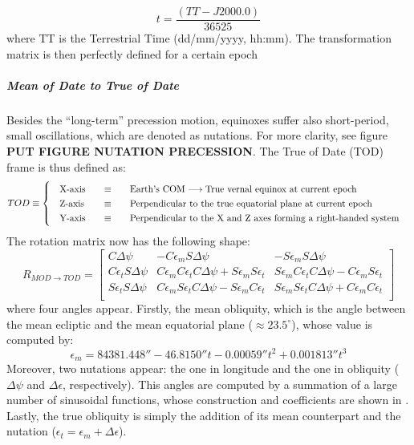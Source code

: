 		\[
		t 	= \dfrac{\left(TT - J2000.0\right)}{36525}		
		\]
		\nonindent where TT is the Terrestrial Time (dd/mm/yyyy, hh:mm). The transformation matrix is then perfectly defined for a certain epoch
		\subparagraph{Mean of Date to True of Date \\}
		\indent Besides the ``long-term'' precession motion, equinoxes suffer also short-period, small oscillations, which are denoted as nutations. For more clarity, see figure \textbf{PUT FIGURE NUTATION PRECESSION}. The True of Date (TOD) frame is thus defined as: \\
		\[
		\arraycolsep=10pt
		\def\arraystretch{1.3}
		TOD\equiv\left\{
		\begin{array}{lll}
		\text{X-axis} 	& \equiv 	& \text{Earth's COM} \longrightarrow \text{True vernal equinox at current epoch} \\
		\text{Z-axis} 	& \equiv 	& \text{Perpendicular to the true equatorial plane at current epoch} \\
		\text{Y-axis} 	& \equiv 	& \text{Perpendicular to the X and Z axes forming a right-handed system} \\
		\end{array}
		\right.
		\]
		\indent The rotation matrix now has the following shape:
		\begin{equation}
		R_{MOD\rightarrow TOD} = 
		\left[ 
		\begin{array}{lll}
		C \Delta \psi 				& - C \epsilon_m S \Delta \psi 	& - S \epsilon_m S \Delta \psi \\
		C \epsilon_t S \Delta \psi 	& C \epsilon_m C \epsilon_t C \Delta \psi + S \epsilon_m S \epsilon_t & S \epsilon_m C \epsilon_t C \Delta \psi - C \epsilon_m S \epsilon_t \\
		S \epsilon_t S \Delta \psi 	& C \epsilon_m S \epsilon_t C \Delta \psi - S \epsilon_m C \epsilon_t & S \epsilon_m S \epsilon_t C \Delta \psi + C \epsilon_m C \epsilon_t \\
		\end{array}
		\right]
		\label{eq: R_MOD_TOD}
		\end{equation}
		\noindent where four angles appear. Firstly, the mean obliquity, which is the angle between the mean ecliptic and the mean equatorial plane ($\approx 23.5^{\circ}$), whose value is computed by:
		\[
		\epsilon_m = 84381.448'' - 46.8150''t - 0.00059'' t^2 + 0.001813'' t^3		
		\]
		\indent Moreover, two nutations appear: the one in longitude and the one in obliquity ($\Delta \psi$ and $\Delta \epsilon$, respectively). This angles are computed by a summation of a large number of sinusoidal functions, whose construction and coefficients are shown in \cite{IERS_conventions}. Lastly, the true obliquity is simply the addition of its mean counterpart and the nutation ($\epsilon_t = \epsilon_m + \Delta \epsilon$).
